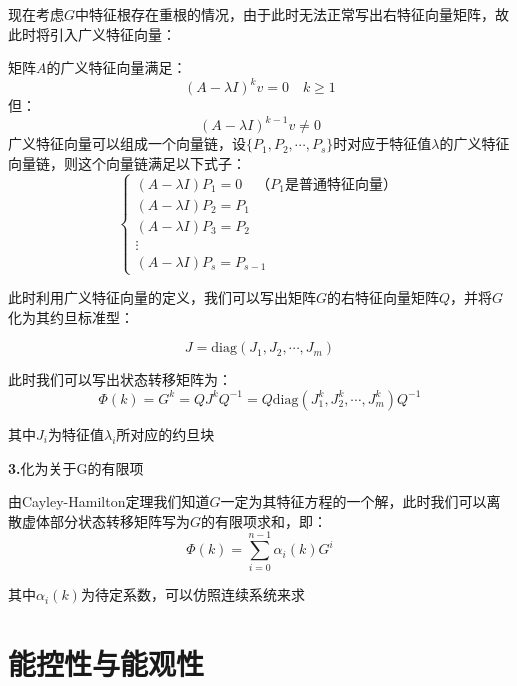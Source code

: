 现在考虑$G$中特征根存在重根的情况，由于此时无法正常写出右特征向量矩阵，故此时将引入广义特征向量：
\begin{definition}[广义特征向量]
    矩阵$A$的广义特征向量满足：
    \begin{equation*}
        (A - \lambda I)^k v = 0 \quad k\geq 1
    \end{equation*}
    但：
    \begin{equation*}
        (A - \lambda I)^{k-1} v \neq 0 
    \end{equation*}
    广义特征向量可以组成一个向量链，设$\{P_1,P_2,\cdots,P_s\}$时对应于特征值$\lambda$的广义特征向量链，则这个向量链满足以下式子：
    \begin{equation*}
        \begin{cases}
            (A - \lambda I) P_1 = 0 \quad \text{（$P_1$是普通特征向量）}  \\
            (A - \lambda I) P_2 = P_1 \\
            (A - \lambda I) P_3 = P_2 \\
            \vdots \\
            (A - \lambda I) P_s = P_{s-1}
        \end{cases}
    \end{equation*}
\end{definition}

此时利用广义特征向量的定义，我们可以写出矩阵$G$的右特征向量矩阵$Q$，并将$G$化为其约旦标准型：

\begin{equation*}
    J = \text{diag}(J_1,J_2,\cdots,J_m)
\end{equation*}

此时我们可以写出状态转移矩阵为：
\begin{equation*}
    \Phi(k) = G^k = Q J^k Q^{-1} = Q \text{diag}(J_1^k,J_2^k,\cdots,J_m^k) Q^{-1}
\end{equation*}

其中$J_i$为特征值$\lambda_i$所对应的约旦块

\noindent \textbf{3.}化为关于G的有限项

由Cayley-Hamilton定理我们知道$G$一定为其特征方程的一个解，此时我们可以离散虚体部分状态转移矩阵写为$G$的有限项求和，即：
\begin{equation*}
    \Phi(k) = \sum_{i=0}^{n-1} \alpha_i(k) G^i
\end{equation*}

其中$\alpha_i(k)$为待定系数，可以仿照连续系统来求

\section{能控性与能观性}

